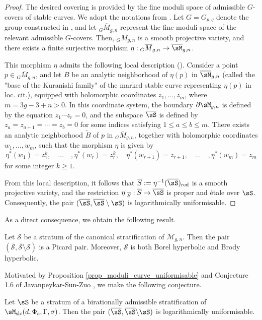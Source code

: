 \documentclass[11pt,letterpaper]{amsart}
\numberwithin{equation}{section}
\begin{document}
    \begin{proof}
    	The desired covering is provided by the fine moduli space of admissible $G$-covers of stable curves. We adopt the notations from \cite[Chapter VXI]{Griffiths2011}. Let $G = G_{p,q}$ denote the group constructed in \cite[Chapter VXI, \S 6]{Griffiths2011}, and let ${_{G}}\overline{M}_{g,n}$ represent the fine moduli space of the relevant admissible $G$-covers. Then, ${_{G}}\overline{M}_{g,n}$ is a smooth projective variety, and there exists a finite surjective morphism $\eta: {_{G}}\overline{M}_{g,n} \to \overline{\sM}_{g,n}$.
    	
    	This morphism $\eta$ admits the following local description (\cite[Remark (9.4)]{Griffiths2011}). Consider a point $p \in {_{G}}\overline{M}_{g,n}$, and let $B$ be an analytic neighborhood of $\eta(p)$ in $\overline{\sM}_{g,n}$ (called the "base of the Kuranishi family" of the marked stable curve representing $\eta(p)$ in loc. cit.), equipped with holomorphic coordinates $z_1, \dots, z_m$, where $m = 3g - 3 + n > 0$. In this coordinate system, the boundary $\partial\sM_{g,n}$ is defined by the equation $z_1 \cdots z_r = 0$, and the subspace $\overline{\sS}$ is defined by $z_a = z_{a+1} = \cdots = z_b = 0$ for some indices satisfying $1 \leq a \leq b \leq m$. There exists an analytic neighborhood $\widetilde{B}$ of $p$ in ${_{G}}\overline{M}_{g,n}$, together with holomorphic coordinates $w_1, \dots, w_m$, such that the morphism $\eta$ is given by
    	$$\eta^\ast(w_1)=z_1^k,\quad\dots\quad, \eta^\ast(w_r)=z_r^k,\quad \eta^\ast(w_{r+1})=z_{r+1}, \quad\dots\quad, \eta^\ast(w_{m})=z_{m}$$
    	for some integer $k \geq 1$.
    	
    	From this local description, it follows that $\overline{S} := \eta^{-1}(\overline{\sS})_{\rm red}$ is a smooth projective variety, and the restriction $\eta|_{\overline{S}}: \overline{S} \to \overline{\sS}$ is proper and \'etale over $\sS$. Consequently, the pair $(\overline{\sS}, \overline{\sS} \setminus \sS)$ is logarithmically uniformisable.
    \end{proof}
    As a direct consequence, we obtain the following result.    
    \begin{cor}
    	Let $\mathscr{S}$ be a stratum of the canonical stratification of $\overline{\mathscr{M}}_{g,n}$. Then the pair $(\overline{\mathscr{S}}, \overline{\mathscr{S}} \setminus \mathscr{S})$ is a Picard pair. Moreover, $\mathscr{S}$ is both Borel hyperbolic and Brody hyperbolic.
    \end{cor}
    Motivated by Proposition \ref{prop_moduli_curve_uniformisable} and Conjecture 1.6 of Javanpeykar-Sun-Zuo \cite{JSZ2024}, we make the following conjecture.
    \begin{conj}
    	Let $\sS$ be a stratum of a birationally admissible stratification of $\sM_{\rm slc}(d, \Phi_c, \Gamma, \sigma)$. Then the pair $(\overline{\sS},\overline{\sS}\backslash \sS)$ is logarithmically uniformisable.
    \end{conj}
	
	
\end{document}
